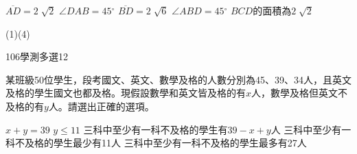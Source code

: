 \begin{QUESTIONS}
\begin{QUESTION}
\begin{QBODY}
			\begin{QOPS}
			\QOP $\overline{AD}=2\sqrt[{}]{2}$
			\QOP $\angle DAB=45{}^\circ $
			\QOP $\overline{BD}=2\sqrt[{}]{6}$
			\QOP $\angle ABD=45{}^\circ $
			\QOP $BCD$的面積為$2\sqrt[{}]{2}$
			\end{QOPS}
        \end{QBODY}
        \begin{QFROMS}
        \end{QFROMS}
        \begin{QTAGS}\end{QTAGS}
        \begin{QANS}
            (1)(4)
        \end{QANS}
        \begin{QSOLLIST}
        \end{QSOLLIST}
        \begin{QEMPTYSPACE}
        \end{QEMPTYSPACE}
    \end{QUESTION}
    \begin{QUESTION}
        \begin{ExamInfo}{106}{學測}{多選}{12}
        \end{ExamInfo}
        \begin{ExamAnsRateInfo}{28}{37}{27}{20}
        \end{ExamAnsRateInfo}
        \begin{QBODY}
            某班級50位學生，段考國文、英文、數學及格的人數分別為45、39、34人，且英文及格的學生國文也都及格。現假設數學和英文皆及格的有$x$人，數學及格但英文不及格的有$y$人。請選出正確的選項。
			\begin{QOPS}
				\QOP $x+y=39$
				\QOP $y\le 11$
				\QOP 三科中至少有一科不及格的學生有$39-x+y$人
				\QOP 三科中至少有一科不及格的學生最少有11人
				\QOP 三科中至少有一科不及格的學生最多有27人
			\end{QOPS}
        \end{QBODY}
        \begin{QFROMS}
        \end{QFROMS}
        \begin{QTAGS}\end{QTAGS}
        \begin{QANS}

\end{QANS}
\end{QUESTION}
\end{QUESTIONS}
